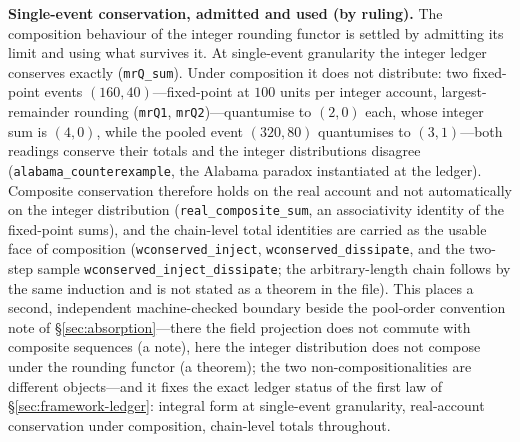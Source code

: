 \documentclass[11pt,a4paper]{article}
\newcommand{\thm}[1]{\nolinkurl{#1}}
\begin{document}
\textbf{Single-event conservation, admitted and used (by ruling).} The composition behaviour of the integer rounding functor is settled by admitting its limit and using what survives it. At single-event granularity the integer ledger conserves exactly (\thm{mrQ_sum}). Under composition it does not distribute: two fixed-point events $(160,40)$---fixed-point at $100$ units per integer account, largest-remainder rounding (\thm{mrQ1}, \thm{mrQ2})---quantumise to $(2,0)$ each, whose integer sum is $(4,0)$, while the pooled event $(320,80)$ quantumises to $(3,1)$---both readings conserve their totals and the integer distributions disagree (\thm{alabama_counterexample}, the Alabama paradox instantiated at the ledger). Composite conservation therefore holds on the real account and not automatically on the integer distribution (\thm{real_composite_sum}, an associativity identity of the fixed-point sums), and the chain-level total identities are carried as the usable face of composition (\thm{wconserved_inject}, \thm{wconserved_dissipate}, and the two-step sample \thm{wconserved_inject_dissipate}; the arbitrary-length chain follows by the same induction and is not stated as a theorem in the file). This places a second, independent machine-checked boundary beside the pool-order convention note of \S\ref{sec:absorption}---there the field projection does not commute with composite sequences (a note), here the integer distribution does not compose under the rounding functor (a theorem); the two non-compositionalities are different objects---and it fixes the exact ledger status of the first law of \S\ref{sec:framework-ledger}: integral form at single-event granularity, real-account conservation under composition, chain-level totals throughout.
\end{document}
